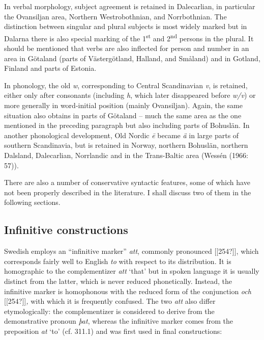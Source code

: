 \begin{styleBodytextC}
In verbal morphology, subject agreement is retained in Dalecarlian, in particular the Ovansiljan area, Northern Westrobothnian, and Norrbothnian. The distinction between singular and plural subjects is most widely marked but in Dalarna there is also special marking of the 1\textsuperscript{st} and 2\textsuperscript{nd} persons in the plural. It should be mentioned that verbs are also inflected for person and number in an area in Götaland (parts of Västergötland, Halland, and Småland) and in Gotland, Finland and parts of Estonia.

\end{styleBodytextC}

\begin{styleBodytextC}
In phonology, the old \textit{w}, corresponding to Central Scandinavian \textit{v}, is retained, either only after consonants (including \textit{h}, which later disappeared before \textit{w/v}) or more generally in word-initial position (mainly Ovansiljan). Again, the same situation also obtains in parts of Götaland – much the same area as the one mentioned in the preceding paragraph but also including parts of Bohuslän. In another phonological development, Old Nordic \textit{\=e} became \textit{ä }in large parts of southern Scandinavia, but is retained in Norway, northern Bohuslän, northern Dalsland, Dalecarlian, Norrlandic and in the Trans-Baltic area (Wessén (1966: 57)).

\end{styleBodytextC}

\begin{styleBodytextC}
There are also a number of conservative syntactic features, some of which have not been properly described in the literature. I shall discuss two of them in the following sections.

\end{styleBodytextC}

\subsection{\rmfamily Infinitive constructions}
\label{bkm:Ref218337377}
\begin{styleBodyTextFirst}
Swedish employs an “infinitive marker” \textit{att}, commonly pronounced [[254?]], which corresponds fairly well to English \textit{to }with respect to its distribution. It is homographic to the complementizer \textit{att} ‘that’ but in spoken language it is usually distinct from the latter, which is never reduced phonetically. Instead, the infinitive marker is homophonous with the reduced form of the conjunction \textit{och }[[254?]]\textit{, }with which it is frequently confused. The two \textit{att} also differ etymologically: the complementizer is considered to derive from the demonstrative pronoun \textit{þat}, whereas the infinitive marker comes from the preposition \textit{at} ‘to’ (cf. 311.1) and was first used in final constructions: 

\end{styleBodyTextFirst}

